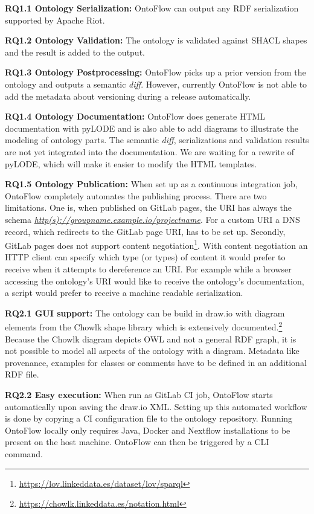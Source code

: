 \documentclass[runningheads]{llncs}
\begin{document}
\noindent\textbf{RQ1.1 Ontology Serialization:} OntoFlow can output any RDF serialization supported by Apache Riot.

\noindent\textbf{RQ1.2 Ontology Validation:} The ontology is validated against SHACL shapes and the result is added to the output.

\noindent\textbf{RQ1.3 Ontology Postprocessing:} OntoFlow picks up a prior version from the ontology and outputs a semantic \textit{diff}. However, currently OntoFlow is not able to add the metadata about versioning during a release automatically.

\noindent\textbf{RQ1.4 Ontology Documentation:} OntoFlow does generate HTML documentation with pyLODE and is also able to add diagrams to illustrate the modeling of ontology parts. The semantic \textit{diff}, serializations and validation results are not yet integrated into the documentation. We are waiting for a rewrite of pyLODE, which will make it easier to modify the HTML templates.

\noindent\textbf{RQ1.5 Ontology Publication:} When set up as a continuous integration job, OntoFlow completely automates the publishing process. There are two limitations. One is, when published on GitLab pages, the URI has always the schema \textit{\url{http(s)://groupname.example.io/projectname}}. For a custom URI a DNS record, which redirects to the GitLab page URI, has to be set up. Secondly, GitLab pages does not support content negotiation\footnote{\url{https://lov.linkeddata.es/dataset/lov/sparql}}. With content negotiation an HTTP client can specify which type (or types) of content it would prefer to receive when it attempts to dereference an URI. For example while a browser accessing the ontology's URI would like to receive the ontology's documentation, a script would prefer to receive a machine readable serialization. 

\noindent\textbf{RQ2.1 GUI support:} The ontology can be build in draw.io with diagram elements from the Chowlk shape library which is extensively documented.\footnote{\url{https://chowlk.linkeddata.es/notation.html}} Because the Chowlk diagram depicts OWL and not a general RDF graph, it is not possible to model all aspects of the ontology with a diagram. Metadata like provenance, examples for classes or comments have to be defined in an additional RDF file.

\noindent\textbf{RQ2.2 Easy execution:} When run as GitLab CI job, OntoFlow starts automatically upon saving the draw.io XML. Setting up this automated workflow is done by copying a CI configuration file to the ontology repository. Running OntoFlow locally only requires Java, Docker and Nextflow installations to be present on the host machine. OntoFlow can then be triggered by a CLI command.
\end{document}
